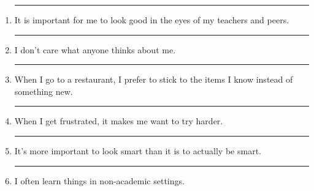 \documentclass[letterpaper, 11pt]{article}
\begin{document}
\begin{enumerate}
	\item \rule{.5in}{.01in} It is important for me to look good in the eyes of my teachers and peers.
	
	\item \rule{.5in}{.01in} I don't care what anyone thinks about me.
	
	\item \rule{.5in}{.01in} When I go to a restaurant, I prefer to stick to the items I know instead of something new. 
	
	\item \rule{.5in}{.01in} When I get frustrated, it makes me want to try harder.
	
	\item \rule{.5in}{.01in} It's more important to look smart than it is to actually be smart.
	
	\item \rule{.5in}{.01in} I often learn things in non-academic settings.
	
	
	
	
	
	
	
	


	
\end{enumerate}
 
\end{document}
